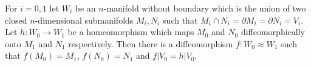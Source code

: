 For $i = 0, 1$ let $W_i$ be an $n$-manifold without boundary which is the union of two closed $n$-dimensional submanifolds $M_i, N_i$ such that $M_i \cap N_i = \partial M_i = \partial N_i = V_i$. Let $h: W_0 \to W_1$ be a homeomorphism which maps $M_0$ and $N_0$ diffeomorphically onto $M_1$ and $N_1$ respectively. Then there is a diffeomorphism $f: W_0 \approx W_1$ such that $f(M_0) = M_1$, $f(N_0) = N_1$ and $f|V_0 = h|V_0$.
